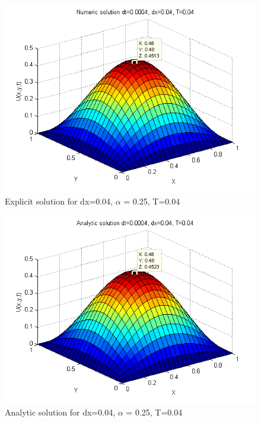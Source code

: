 \documentclass[a4paper,10pt]{article}
\begin{document}
\begin{figure}
  \begin{center}
    \includegraphics[scale=0.5]{num_dt00004_dx004_T004}
    \caption{Explicit solution for dx=0.04, $\alpha$ = 0.25, T=0.04}
    \label{fig:Num_dx0.04}
  \end{center}

\end{figure}
\begin{figure}
  \begin{center}
    \includegraphics[scale=0.5]{ana_dt00004_dx004_T004}
    \caption{Analytic solution for dx=0.04, $\alpha$ = 0.25, T=0.04}
    \label{fig:Ana_dx0.04}
  \end{center}

\end{figure}
\end{document}
